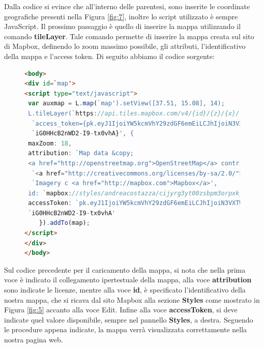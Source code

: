 \documentclass[a4paper,11pt]{article}
\begin{document}
Dalla codice si evince che all'interno delle parentesi, sono inserite le coordinate geografiche presenti nella Figura \ref{fig:7}, inoltre lo script utilizzato è sempre JavaScript.
Il prossimo passaggio è quello di inserire la mappa utilizzando il comando \textbf{tileLayer}. Tale comando permette di inserire la mappa creata sul sito di Mapbox, definendo lo zoom massimo possibile, gli attributi, l'identificativo della mappa e l'access token. Di seguito abbiamo il codice sorgente:
\begin{figure}[htb]
\begin{lstlisting}[language=HTML, basicstyle=\large]
<body>		
<div id=`map'>
<script type="text/javascript">
 var auxmap = L.map(`map').setView([37.51, 15.08], 14);
 L.tileLayer(`https://api.tiles.mapbox.com/v4/{id}/{z}/{x}/{y}.png?'+ 
  `access_token={pk.eyJ1IjoiYW5kcmVhY29zdGF6emEiLCJhIjoiN3VXTWIxayJ9.'+
  `iG0HHcB2nWD2-I9-tx0vhA}', {
 maxZoom: 18,
 attribution: `Map data &copy; 
 <a href="http://openstreetmap.org">OpenStreetMap</a> contributors, '+
  `<a href="http://creativecommons.org/licenses/by-sa/2.0/">CC-BY-SA</a>, '+
  `Imagery c <a href="http://mapbox.com">Mapbox</a>',
 id: `mapbox://styles/andreacostazza/cijyrg3yt00zsbpm3orpxkj2l'
 accessToken: `pk.eyJ1IjoiYW5kcmVhY29zdGF6emEiLCJhIjoiN3VXTWIxayJ9.'+
 `iG0HHcB2nWD2-I9-tx0vhA'
	}).addTo(map);
</script>
</div>
</body>
\end{lstlisting}
\end{figure}
\newpage
Sul codice precedente per il caricamento della mappa, si nota che nella prima voce è indicato il collegamento ipertestuale della mappa, alla voce \textbf{attribution} sono indicate le licenze, mentre alla voce \textbf{id}, è specificato l'identificativo della nostra mappa, che si ricava dal sito Mapbox alla sezione \textbf{Styles} come mostrato in Figura \ref{fig:5} accanto alla voce Edit.
Infine alla voce \textbf{accessToken}, si deve indicate quel valore disponibile, sempre nel pannello \textbf{Styles}, a destra. \newline
Seguendo le procedure appena indicate, la mappa verrà visualizzata correttamente nella nostra pagina web.
\end{document}
